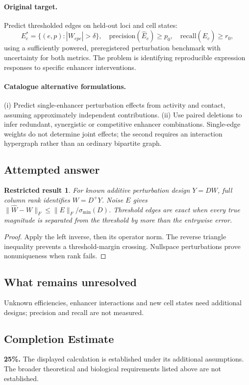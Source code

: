\documentclass[11pt]{article}
\newtheorem{attemptresult}{Restricted result}[section]
\begin{document}
\paragraph{Original target.}
Predict thresholded edges on held-out loci and cell states:
\[
E_c^*=\{(e,p):|W_{epc}|>\delta\},
\quad \mathrm{precision}(\widehat E_c)\geq p_0,\quad
\mathrm{recall}(\widehat E_c)\geq r_0,
\]
using a sufficiently powered, preregistered perturbation benchmark with uncertainty for both metrics. The problem is identifying reproducible expression responses to specific enhancer interventions.
\paragraph{Catalogue alternative formulations.}
(i) Predict single-enhancer perturbation effects from activity and contact, assuming approximately independent contributions. (ii) Use paired deletions to infer redundant, synergistic or competitive enhancer combinations. Single-edge weights do not determine joint effects; the second requires an interaction hypergraph rather than an ordinary bipartite graph.
\subsection{Attempted answer}
\begin{attemptresult}
For known additive perturbation design $Y=DW$, full column rank identifies $W=D^+Y$. Noise $E$ gives $\|\widehat W-W\|_F\leq\|E\|_F/\sigma_{\min}(D)$. Threshold edges are exact when every true magnitude is separated from the threshold by more than the entrywise error.
\end{attemptresult}
\begin{proof}
Apply the left inverse, then its operator norm. The reverse triangle inequality prevents a threshold-margin crossing. Nullspace perturbations prove nonuniqueness when rank fails.
\end{proof}
\subsection{What remains unresolved}
Unknown efficiencies, enhancer interactions and new cell states need additional designs; precision and recall are not measured.
\subsection{Completion Estimate}
\textbf{25\%.} The displayed calculation is established under its additional assumptions. The broader theoretical and biological requirements listed above are not established.
\end{document}
